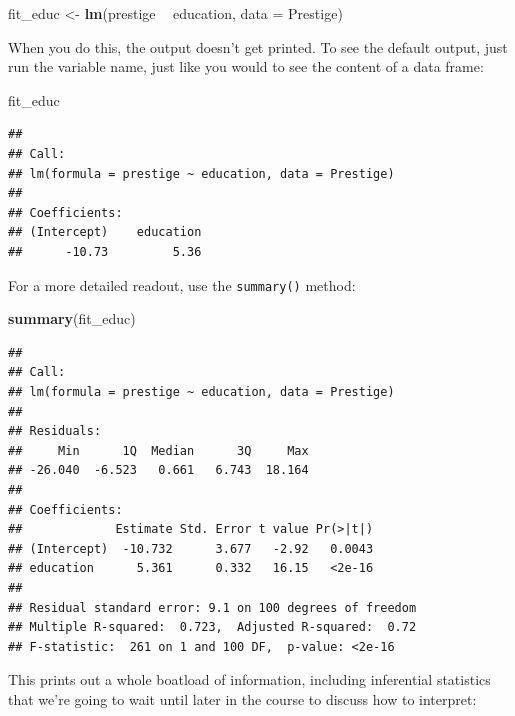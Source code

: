 \documentclass[12pt,oneside,openany]{book}
\newenvironment{Shaded}{\begin{snugshade}}{\end{snugshade}}
\newcommand{\KeywordTok}[1]{\textcolor[rgb]{0.13,0.29,0.53}{\textbf{#1}}}
\newcommand{\DataTypeTok}[1]{\textcolor[rgb]{0.13,0.29,0.53}{#1}}
\newcommand{\StringTok}[1]{\textcolor[rgb]{0.31,0.60,0.02}{#1}}
\newcommand{\OperatorTok}[1]{\textcolor[rgb]{0.81,0.36,0.00}{\textbf{#1}}}
\newcommand{\NormalTok}[1]{#1}
\begin{document}
\begin{Shaded}
\begin{Highlighting}[]
\NormalTok{fit_educ <-}\StringTok{ }\KeywordTok{lm}\NormalTok{(prestige }\OperatorTok{~}\StringTok{ }\NormalTok{education, }\DataTypeTok{data =}\NormalTok{ Prestige)}
\end{Highlighting}
\end{Shaded}

When you do this, the output doesn't get printed. To see the default
output, just run the variable name, just like you would to see the
content of a data frame:

\begin{Shaded}
\begin{Highlighting}[]
\NormalTok{fit_educ}
\end{Highlighting}
\end{Shaded}

\begin{verbatim}
## 
## Call:
## lm(formula = prestige ~ education, data = Prestige)
## 
## Coefficients:
## (Intercept)    education  
##      -10.73         5.36
\end{verbatim}

For a more detailed readout, use the \texttt{summary()} method:

\begin{Shaded}
\begin{Highlighting}[]
\KeywordTok{summary}\NormalTok{(fit_educ)}
\end{Highlighting}
\end{Shaded}

\begin{verbatim}
## 
## Call:
## lm(formula = prestige ~ education, data = Prestige)
## 
## Residuals:
##     Min      1Q  Median      3Q     Max 
## -26.040  -6.523   0.661   6.743  18.164 
## 
## Coefficients:
##             Estimate Std. Error t value Pr(>|t|)
## (Intercept)  -10.732      3.677   -2.92   0.0043
## education      5.361      0.332   16.15   <2e-16
## 
## Residual standard error: 9.1 on 100 degrees of freedom
## Multiple R-squared:  0.723,  Adjusted R-squared:  0.72 
## F-statistic:  261 on 1 and 100 DF,  p-value: <2e-16
\end{verbatim}

This prints out a whole boatload of information, including inferential
statistics that we're going to wait until later in the course to discuss
how to interpret:
\end{document}
